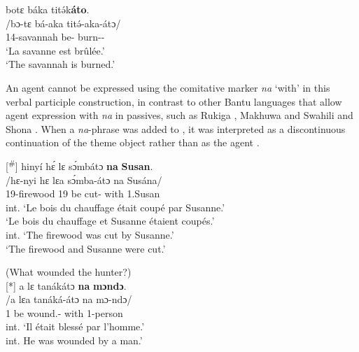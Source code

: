 \documentclass[output=paper,colorlinks,citecolor=brown
]{langscibook}
\begin{document}
\ex
\glll
{\db}botɛ báka titə́k\textbf{áto}. \\
/bɔ-tɛ bá-aka titə́-aka-átɔ/ \\
{\db}14-savannah be-\DUR{} burn-\DUR{}-\PTCP{} \\
\glt
`La savanne est brûlée.' \\ `The savannah is burned.' 

\z
\z

An agent cannot be expressed using the comitative marker \textit{na} `with' in this verbal participle construction, in contrast to other Bantu languages that allow agent expression with \textit{na} in passives, such as Rukiga \parencite{chapters/rukiga}, Makhuwa \parencite{chapters/makhuwa} and Swahili and Shona \citep{Fleisch2005}. When a \textit{na}-phrase was added to , it was interpreted as a discontinuous continuation of the theme object rather than as the agent .\largerpage[2]


\ea
[\textsuperscript{$\#$}]{
\label{dontcutsusanne}
\glll
{\db}hinyí hɛ́ lɛ sɔ́mbátɔ \textbf{na} \textbf{Susan}. \\
/hɛ-nyi hɛ lɛa sɔ́mba-átɔ na Susána/ \\
{\db}19-firewood 19\SM{} be cut-\PTCP{} with 1.Susan \\
\glt
int. `Le bois du chauffage était coupé par Susanne.' \\  `Le bois du chauffage et Susanne étaient coupés.' \\ int. `The firewood was cut by Susanne.' \\ `The firewood and Susanne were cut.' \jambox*{[EE+EB 1673] }
}
 \z

\ea
(What wounded the hunter?) \\
\sn
[*]{
\glll
{\db}a lɛ tanákátɔ \textbf{na} \textbf{mɔndɔ}. \\
/a lɛa tanáká-átɔ na mɔ-ndɔ/ \\
{\db}1\SM{} be wound.\DUR{}-\PTCP{} with 1-person \\
\glt
int. `Il était blessé par l'homme.' \\ int. He was wounded by a man.' \jambox*{[JO 1615] }
}

\z
\end{document}
